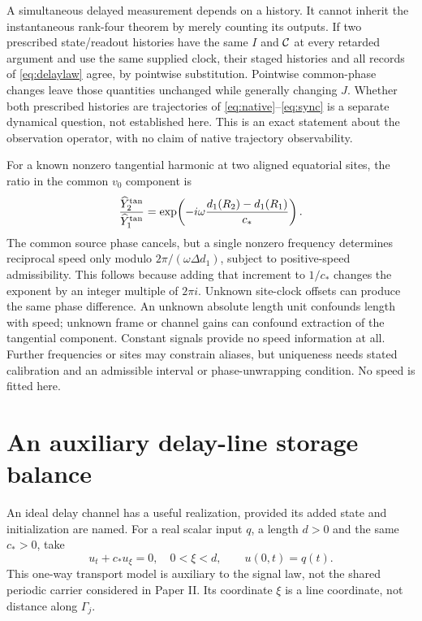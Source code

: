 A simultaneous delayed measurement depends on a history. It cannot inherit the instantaneous rank-four theorem by merely counting its outputs. If two prescribed state/readout histories have the same $I$ and $\mathcal C$ at every retarded argument and use the same supplied clock, their staged histories and all records of \eqref{eq:delaylaw} agree, by pointwise substitution. Pointwise common-phase changes leave those quantities unchanged while generally changing $J$. Whether both prescribed histories are trajectories of \eqref{eq:native}--\eqref{eq:sync} is a separate dynamical question, not established here. This is an exact statement about the observation operator, with no claim of native trajectory observability.

For a known nonzero tangential harmonic at two aligned equatorial sites, the ratio in the common $v_0$ component is
\begin{equation}\label{eq:aliases}
\frac{\widehat Y_2^{\rm tan}}{\widehat Y_1^{\rm tan}}
=\exp\!\left(-i\omega\frac{d_1(R_2)-d_1(R_1)}{c_*}\right).
\end{equation}
The common source phase cancels, but a single nonzero frequency determines reciprocal speed only modulo $2\pi/(\omega\Delta d_1)$, subject to positive-speed admissibility. This follows because adding that increment to $1/c_*$ changes the exponent by an integer multiple of $2\pi i$. Unknown site-clock offsets can produce the same phase difference. An unknown absolute length unit confounds length with speed; unknown frame or channel gains can confound extraction of the tangential component. Constant signals provide no speed information at all. Further frequencies or sites may constrain aliases, but uniqueness needs stated calibration and an admissible interval or phase-unwrapping condition. No speed is fitted here.

\section{An auxiliary delay-line storage balance}\label{sec:storage}
An ideal delay channel has a useful realization, provided its added state and initialization are named. For a real scalar input $q$, a length $d>0$ and the same $c_*>0$, take
\begin{equation}\label{eq:transport}
u_t+c_*u_\xi=0,\quad 0<\xi<d,\qquad u(0,t)=q(t).
\end{equation}
This one-way transport model is auxiliary to the signal law, not the shared periodic carrier considered in Paper II. Its coordinate $\xi$ is a line coordinate, not distance along $\Gamma_j$.

